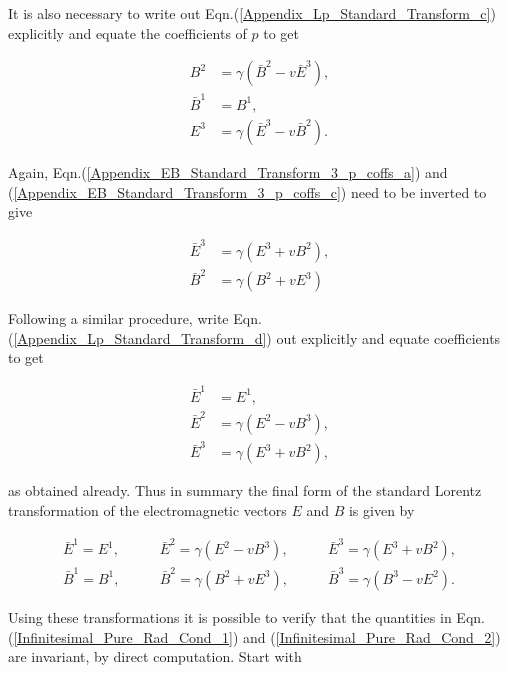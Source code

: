 \begin{appendix}
\noindent It is also necessary to write out Eqn.(\ref{Appendix_Lp_Standard_Transform_c}) explicitly and equate the coefficients of $p$ to get

\begin{align}
\label{Appendix_EB_Standard_Transform_3_p_coffs_a}
B^2 & = \gamma (\bar{B}^2 - v\bar{E}^3),
\\\label{Appendix_EB_Standard_Transform_3_p_coffs_b}
\bar{B}^1 & = {B}^1,
\\\label{Appendix_EB_Standard_Transform_3_p_coffs_c}
E^3 & = \gamma(\bar{E}^3 - v\bar{B}^2).
\end{align}

\noindent Again, Eqn.(\ref{Appendix_EB_Standard_Transform_3_p_coffs_a}) and (\ref{Appendix_EB_Standard_Transform_3_p_coffs_c}) need to be inverted to give

\begin{subequations}
\begin{align}
\label{Appendix_EB_Standard_Transform_3_p_coeffs_Inverted_a}
\bar{E}^3 & = \gamma (E^3 + vB^2),
\\\label{Appendix_EB_Standard_Transform_3_p_coeffs_Inverted_b}
\bar{B}^2 & = \gamma (B^2 + vE^3)
\end{align}
\end{subequations}

\noindent Following a similar procedure, write Eqn.(\ref{Appendix_Lp_Standard_Transform_d}) out explicitly and equate coefficients to get

\begin{align*}
\bar{E}^1 & = E^1,\\
\bar{E}^2 & = \gamma (E^2 - vB^3),\\
\bar{E}^3 & = \gamma (E^3 + vB^2),
\end{align*}

\noindent as obtained already. Thus in summary the final form of the standard Lorentz transformation of the electromagnetic vectors $E$ and $B$ is given by

\begin{eqnarray*}
\bar{E}^1 = E^1, \qquad  & \bar{E}^2 = \gamma (E^2 - vB^3), \qquad  & \bar{E}^3 = \gamma(E^3 + vB^2),\\
\bar{B}^1 = B^1, \qquad  & \bar{B}^2 = \gamma (B^2 + vE^3), \qquad  & \bar{B}^3 = \gamma (B^3 - vE^2). 
\end{eqnarray*}

\noindent Using these transformations it is possible to verify that the quantities in Eqn.(\ref{Infinitesimal_Pure_Rad_Cond_1}) and (\ref{Infinitesimal_Pure_Rad_Cond_2}) are invariant, by direct computation. Start with


\end{appendix}
